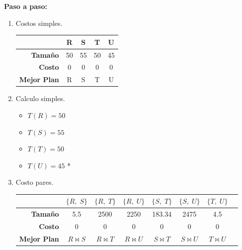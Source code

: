 \documentclass{templateNote}
\newcommand{\newparagraph}{\par\vspace{\baselineskip}\noindent}
\begin{document}
\begin{enumerate}
    \textbf{Paso a paso:}
    \begin{enumerate}[label=\arabic*)]
        \item Costos simples.
        \begin{center}
            \begin{tabular}{|r|c|c|c|c|}
                \hline
                & R & S & T & U \\
                \hline
                \textbf{Tamaño} & 50 & 55 & 50 & 45 \\
                \hline
                \textbf{Costo}  & 0 & 0 & 0 & 0 \\
                \hline
                \textbf{Mejor Plan} & R & S & T & U \\
                \hline
            \end{tabular}
        \end{center}
        \newparagraph

        \item Calculo simples.
        \newparagraph
        \begin{minipage}{0.5\textwidth}
            \begin{itemize}
                \item $T(R) = 50$
                \item $T(S) = 55$
            \end{itemize}
        \end{minipage}
        \hfill
        \begin{minipage}{0.5\textwidth}
            \begin{itemize}
                \item $T(T) = 50$
                \item $T(U) = 45$ *
            \end{itemize}
        \end{minipage}
        \newparagraph

        \item Costo pares.
        \begin{center}
            \begin{tabular}{|r|c|c|c|c|c|c|c|}
                \hline
                & $\{R, \; S\}$ & $\{R, \; T\}$ & $\{R, \; U\}$ & $\{S, \; T\}$ & $\{S, \; U\}$ & $\{T, \; U\}$ \\
                \hline
                \textbf{Tamaño} & 5.5 & 2500 & 2250 & 183.34 & 2475 & 4.5 \\
                \hline
                \textbf{Costo}  & 0 & 0 & 0 & 0 & 0 & 0 \\
                \hline
                \textbf{Mejor Plan} & $R \Join S$ & $R \Join T$ & $R \Join U$ & $S \Join T$ & $S \Join U$ & $T \Join U$ \\
                \hline
            \end{tabular}
        \end{center}
        \newparagraph


\end{enumerate}
\end{enumerate}
\end{document}

